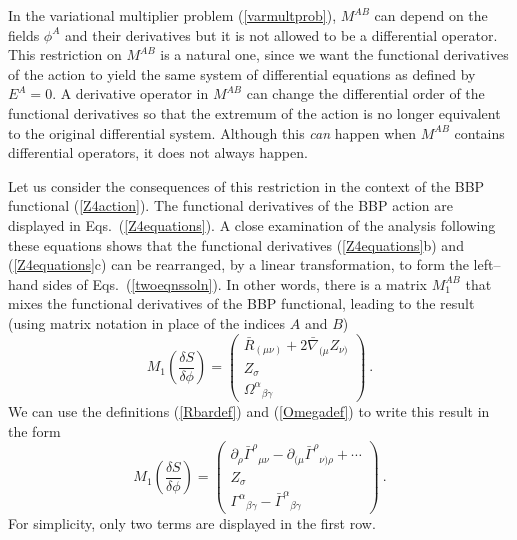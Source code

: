 \documentclass[letterpaper,nofootinbib,prd,amsmath,twocolumn]{revtex4-1}
\begin{document}
In the variational multiplier problem (\ref{varmultprob}), $M^{AB}$ can depend on the fields 
$\phi^A$ and their derivatives but it is not allowed to be a differential operator. 
This restriction on $M^{AB}$  is a natural one, since 
we want the functional derivatives of the action to yield the same system of differential equations 
as defined by $E^A = 0$. A derivative operator in $M^{AB}$ can change the differential order of the 
functional derivatives so that the extremum of the action is no longer  equivalent to 
the original differential system. Although this {\it can} happen when $M^{AB}$ contains differential operators, it 
does not always happen. 

Let us consider the consequences of this restriction in the context of the BBP functional (\ref{Z4action}). 
The functional derivatives of the BBP action are displayed in Eqs.~(\ref{Z4equations}). 
A close examination of the
analysis following these equations shows that the functional derivatives 
(\ref{Z4equations}b) and (\ref{Z4equations}c) can be rearranged, by a linear transformation, to 
form the left--hand sides of Eqs.~(\ref{twoeqnssoln}). In other words, there is a matrix $M_1^{AB}$ that 
mixes the functional derivatives of the BBP functional, leading to the result (using matrix notation 
in place of the indices $A$ and $B$) 
\begin{equation}\label{M1mixingA}
      M_1 \left( \frac{\delta S}{\delta \phi} \right) = 
      \left(  \begin{array}{c} \bar R_{(\mu\nu)} + 2\bar\nabla_{(\mu} Z_{\nu)} \\
      Z_\sigma \\
      \Omega^\alpha{}_{\beta\gamma} \end{array} \right)   \ .
\end{equation}
We can use the definitions (\ref{Rbardef}) and (\ref{Omegadef}) to write this result in the form 
\begin{equation}\label{M1mixing}
      M_1 \left( \frac{\delta S}{\delta \phi} \right) 
      = \left( \begin{array}{c} \partial_\rho \bar\Gamma^\rho{}_{\mu\nu} 
      - \partial_{(\mu} \bar\Gamma^\rho{}_{\nu)\rho} + \cdots \\
      Z_\sigma \\
      \Gamma^\alpha{}_{\beta\gamma} - \bar\Gamma^\alpha{}_{\beta\gamma} \end{array} \right)  \ .
\end{equation}
For simplicity, only two terms are displayed in the first row. 
\end{document}
